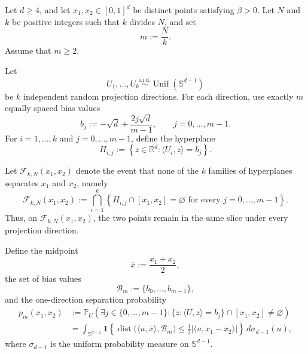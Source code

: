 \begin{theorem}
\label{thm:multiple-directions}

Let $d\geq 4$, and let $x_1,x_2\in[0,1]^d$ be distinct points satisfying
$\beta>0$. Let $N$ and $k$ be positive integers such that $k$ divides
$N$, and set
\begin{equation}
    m:=\frac{N}{k}.
    \label{eq:m-definition}
\end{equation}
Assume that $m\geq2$.

Let
\[
    U_1,\ldots,U_k
    \overset{\mathrm{i.i.d.}}{\sim}
    \operatorname{Unif}(\mathbb{S}^{d-1})
\]
be $k$ independent random projection directions. For each direction,
use exactly $m$ equally spaced bias values
\begin{equation}
    b_j
    :=
    -\sqrt{d}
    +
    \frac{2j\sqrt{d}}{m-1},
    \qquad
    j=0,\ldots,m-1.
    \label{eq:ctp-bias-grid}
\end{equation}
For $i=1,\ldots,k$ and $j=0,\ldots,m-1$, define the hyperplane
\begin{equation}
    H_{i,j}
    :=
    \left\{
        z\in\mathbb{R}^d:
        \langle U_i,z\rangle=b_j
    \right\}.
    \label{eq:ctp-hyperplanes}
\end{equation}

Let $\mathcal{F}_{k,N}(x_1,x_2)$ denote the event that none of the $k$
families of hyperplanes separates $x_1$ and $x_2$, namely
\begin{equation}
    \mathcal{F}_{k,N}(x_1,x_2)
    :=
    \bigcap_{i=1}^k
    \left\{
        H_{i,j}\cap[x_1,x_2]=\varnothing
        \text{ for every }j=0,\ldots,m-1
    \right\}.
    \label{eq:failure-event}
\end{equation}
Thus, on $\mathcal{F}_{k,N}(x_1,x_2)$, the two points remain in the same
slice under every projection direction.

Define the midpoint
\[
    \overline{x}:=\frac{x_1+x_2}{2},
\]
the set of bias values
\[
    \mathcal{B}_m:=\{b_0,\ldots,b_{m-1}\},
\]
and the one-direction separation probability
\begin{align}
    p_m(x_1,x_2)
    &:=
    \mathbb{P}_U
    \left(
        \exists j\in\{0,\ldots,m-1\}:
        \{z:\langle U,z\rangle=b_j\}
        \cap[x_1,x_2]\neq\varnothing
    \right)
    \nonumber\\
    &=
    \int_{\mathbb{S}^{d-1}}
    \mathbf{1}
    \left\{
        \operatorname{dist}
        \bigl(
            \langle u,\overline{x}\rangle,
            \mathcal{B}_m
        \bigr)
        \leq
        \frac{1}{2}
        \left|
            \langle u,x_1-x_2\rangle
        \right|
    \right\}
    \,d\sigma_{d-1}(u),
    \label{eq:exact-one-direction-probability}
\end{align}
where $\sigma_{d-1}$ is the uniform probability measure on
$\mathbb{S}^{d-1}$.


\end{theorem}
